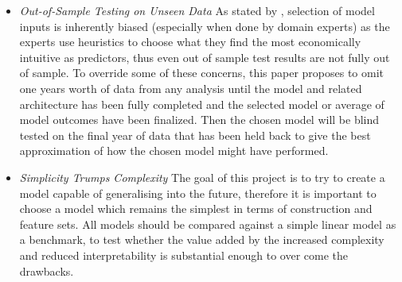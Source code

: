 \documentclass[12pt, a4paper]{article}
\begin{document}
\begin{itemize}
\item \textit{Out-of-Sample Testing on Unseen Data} \newline As stated by \cite{Arnott2018}, selection of model inputs is inherently biased (especially when done by domain experts) as the experts use heuristics to choose what they find the most economically intuitive as predictors, thus even out of sample test results are not fully out of sample. To override some of these concerns, this paper proposes to omit one years worth of data from any analysis until the model and related architecture has been fully completed and the selected model or average of model outcomes have been finalized. Then the chosen model will be blind tested on the final year of data that has been held back to give the best approximation of how the chosen model might have performed. 
\item \textit{Simplicity Trumps Complexity}
\newline The goal of this project is to try to create a model capable of generalising into the future, therefore it is important to choose a model which remains the simplest in terms of construction and feature sets. All models should be compared against a simple linear model as a benchmark, to test whether the value added by the increased complexity and reduced interpretability is substantial enough to over come the drawbacks. 
\end{itemize}
\end{document}
